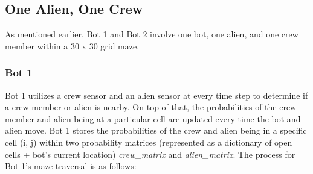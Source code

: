 \documentclass[11pt]{article}
\begin{document}
\subsection{One Alien, One Crew}

As mentioned earlier, Bot 1 and Bot 2 involve one bot, one alien, and one crew member within a 30 x 30 grid maze.

\subsubsection{Bot 1}

Bot 1 utilizes a crew sensor and an alien sensor at every time step to determine if a crew member or alien is nearby. On top of that, the probabilities of the crew member and alien being at a particular cell are updated every time the bot and alien move. Bot 1 stores the probabilities of the crew and alien being in a specific cell (i, j) within two probability matrices (represented as a dictionary of open cells + bot's current location) \textit{crew\_matrix} and \textit{alien\_matrix}. The process for Bot 1's maze traversal is as follows:
\end{document}

